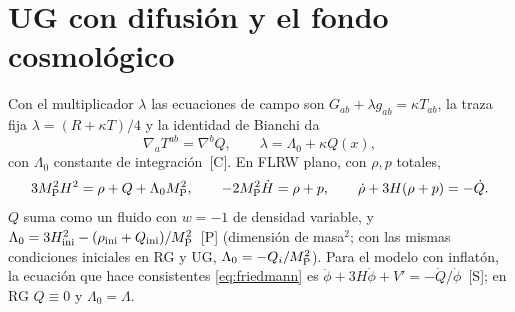 \documentclass[11pt,a4paper]{article}
\numberwithin{equation}{section}
\newcommand{\MP}{M_{\rm P}}\newcommand{\kap}{\kappa}\newcommand{\Lb}{\bar\lambda}\newcommand{\dd}{\mathrm d}\newcommand{\ee}{\mathrm e}
\newcommand{\etq}[1]{\,{\footnotesize\color{gray}[#1]}}
\begin{document}
\section{UG con difusi\'on y el fondo cosmol\'ogico}
\label{sec:fondo}
Con el multiplicador $\lambda$ las ecuaciones de campo son $G_{ab}+\lambda g_{ab}=\kap T_{ab}$, la traza fija $\lambda=(R+\kap T)/4$ y la identidad de Bianchi da
\begin{equation}
\nabla_aT^{ab}=\nabla^bQ,\qquad \lambda=\Lambda_0+\kap Q(x),
\label{eq:Qdef}
\end{equation}
con $\Lambda_0$ constante de integraci\'on \etq{C}. En FLRW plano, con $\rho,p$ totales,
\begin{equation}
3\MP^2H^2=\rho+Q+\Lambda_0\MP^2,\qquad -2\MP^2\dot H=\rho+p,\qquad \dot\rho+3H(\rho+p)=-\dot Q.
\label{eq:friedmann}
\end{equation}
$Q$ suma como un fluido con $w=-1$ de densidad variable, y $\Lambda_0=3H_{\rm ini}^2-(\rho_{\rm ini}+Q_{\rm ini})/\MP^2$ \etq{P} (dimensi\'on de masa$^2$; con las mismas condiciones iniciales en RG y UG, $\Lambda_0=-Q_i/\MP^2$). Para el modelo con inflat\'on, la ecuaci\'on que hace consistentes \eqref{eq:friedmann} es $\ddot\phi+3H\dot\phi+V'=-\dot Q/\dot\phi$ \etq{S}; en RG $Q\equiv0$ y $\Lambda_0=\Lambda$.
\end{document}

